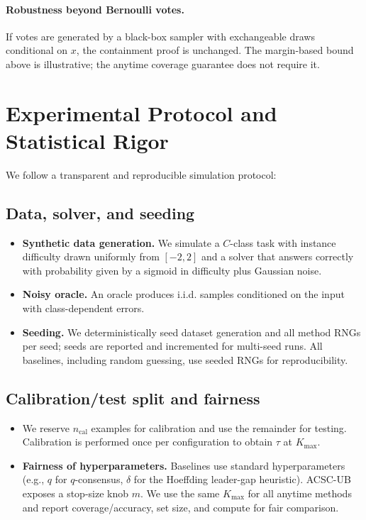 \documentclass[11pt]{article}
\begin{document}
\paragraph{Robustness beyond Bernoulli votes.}
If votes are generated by a black-box sampler with exchangeable draws conditional on $x$, the containment proof is unchanged. The margin-based bound above is illustrative; the anytime coverage guarantee does not require it.

\section{Experimental Protocol and Statistical Rigor}
\label{sec:protocol}
We follow a transparent and reproducible simulation protocol:

\subsection{Data, solver, and seeding}
\begin{itemize}
\item \textbf{Synthetic data generation.} We simulate a $C$-class task with instance difficulty drawn uniformly from $[-2,2]$ and a solver that answers correctly with probability given by a sigmoid in difficulty plus Gaussian noise.
\item \textbf{Noisy oracle.} An oracle produces i.i.d. samples conditioned on the input with class-dependent errors.
\item \textbf{Seeding.} We deterministically seed dataset generation and all method RNGs per seed; seeds are reported and incremented for multi-seed runs. All baselines, including random guessing, use seeded RNGs for reproducibility.
\end{itemize}

\subsection{Calibration/test split and fairness}
\begin{itemize}
\item We reserve $n_{\mathrm{cal}}$ examples for calibration and use the remainder for testing. Calibration is performed once per configuration to obtain $\tau$ at $K_{\max}$.
\item \textbf{Fairness of hyperparameters.} Baselines use standard hyperparameters (e.g., $q$ for $q$-consensus, $\delta$ for the Hoeffding leader-gap heuristic). ACSC-UB exposes a stop-size knob $m$. We use the same $K_{\max}$ for all anytime methods and report coverage/accuracy, set size, and compute for fair comparison.
\end{itemize}
\end{document}
